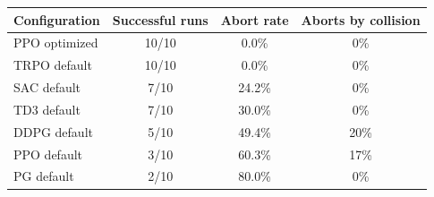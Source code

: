 \begin{tabular}{lccc}
\toprule
Configuration & Successful runs & Abort rate & Aborts by collision \\
\midrule
PPO optimized & 10/10 & 0.0\% & 0\% \\
TRPO default & 10/10 & 0.0\% & 0\% \\
SAC default & 7/10 & 24.2\% & 0\% \\
TD3 default & 7/10 & 30.0\% & 0\% \\
DDPG default & 5/10 & 49.4\% & 20\% \\
PPO default & 3/10 & 60.3\% & 17\% \\
PG default & 2/10 & 80.0\% & 0\% \\
\bottomrule
\end{tabular}
